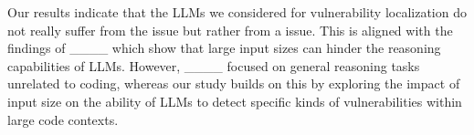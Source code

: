 	Our results indicate that the \acp{LLM} we considered for vulnerability localization do not really suffer from the  issue but rather from a  issue.
	This is aligned with the findings of ____ which show that large input sizes can hinder the reasoning capabilities of \acp{LLM}.
	However, ____ focused on general reasoning tasks unrelated to coding, whereas our study builds on this by exploring the impact of input size on the ability of \acp{LLM} to detect specific kinds of vulnerabilities within large code contexts.